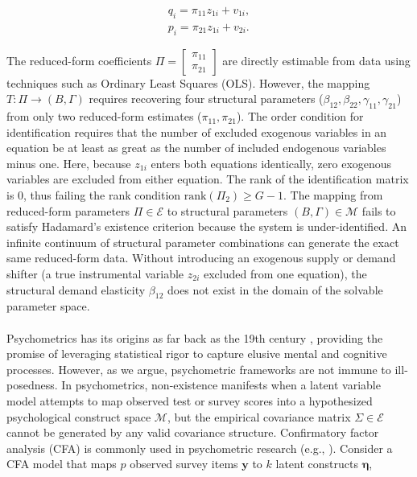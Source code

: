 \documentclass{article}
\theoremstyle{definition}
\begin{document}
\begin{align*}
q_i = \pi_{11}z_{1i} + v_{1i}, \\
p_i = \pi_{21}z_{1i} + v_{2i}.
\end{align*}

\noindent
The reduced-form coefficients $\Pi = \begin{bmatrix} \pi_{11} \\ \pi_{21} \end{bmatrix}$ are directly estimable from data using techniques such as Ordinary Least Squares (OLS). However, the mapping $T: \Pi \to (B, \Gamma)$ requires recovering four structural parameters ($\beta_{12}, \beta_{22}, \gamma_{11}, \gamma_{21}$) from only two reduced-form estimates ($\pi_{11}, \pi_{21}$). The order condition for identification requires that the number of excluded exogenous variables in an equation be at least as great as the number of included endogenous variables minus one. Here, because $z_{1i}$ enters both equations identically, zero exogenous variables are excluded from either equation. The rank of the identification matrix is 0, thus failing the rank condition $\text{rank}(\Pi_2) \ge G - 1$. The mapping from reduced-form parameters $\Pi \in \mathcal{E}$ to structural parameters $(B, \Gamma) \in \mathcal{M}$ fails to satisfy Hadamard's existence criterion because the system is under-identified. An infinite continuum of structural parameter combinations can generate the exact same reduced-form data. Without introducing an exogenous supply or demand shifter (a true instrumental variable $z_{2i}$ excluded from one equation), the structural demand elasticity $\beta_{12}$ does not exist in the domain of the solvable parameter space. \\
\\
Psychometrics has its origins as far back as the 19th century \cite{WBA21}, providing the promise of leveraging statistical rigor to capture elusive mental and cognitive processes. However, as we argue, psychometric frameworks are not immune to ill-posedness. In psychometrics, non-existence manifests when a latent variable model attempts to map observed test or survey scores into a hypothesized psychological construct space $\mathcal{M}$, but the empirical covariance matrix $\Sigma \in \mathcal{E}$ cannot be generated by any valid covariance structure. Confirmatory factor analysis (CFA) is commonly used in psychometric research (e.g., \cite{GA23}). Consider a CFA model that maps $p$ observed survey items $\mathbf{y}$ to $k$ latent constructs $\boldsymbol{\eta}$,
\end{document}
